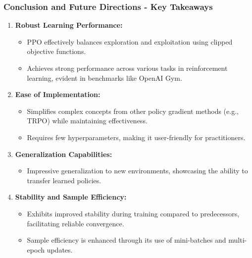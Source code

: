 \documentclass{beamer}
\begin{document}
\begin{frame}[fragile]
    \frametitle{Conclusion and Future Directions - Key Takeaways}
    \begin{enumerate}
        \item \textbf{Robust Learning Performance:}
        \begin{itemize}
            \item PPO effectively balances exploration and exploitation using clipped objective functions.
            \item Achieves strong performance across various tasks in reinforcement learning, evident in benchmarks like OpenAI Gym.
        \end{itemize}

        \item \textbf{Ease of Implementation:}
        \begin{itemize}
            \item Simplifies complex concepts from other policy gradient methods (e.g., TRPO) while maintaining effectiveness.
            \item Requires few hyperparameters, making it user-friendly for practitioners.
        \end{itemize}

        \item \textbf{Generalization Capabilities:}
        \begin{itemize}
            \item Impressive generalization to new environments, showcasing the ability to transfer learned policies.
        \end{itemize}

        \item \textbf{Stability and Sample Efficiency:}
        \begin{itemize}
            \item Exhibits improved stability during training compared to predecessors, facilitating reliable convergence.
            \item Sample efficiency is enhanced through its use of mini-batches and multi-epoch updates.
        \end{itemize}
    \end{enumerate}
\end{frame}
\end{document}
